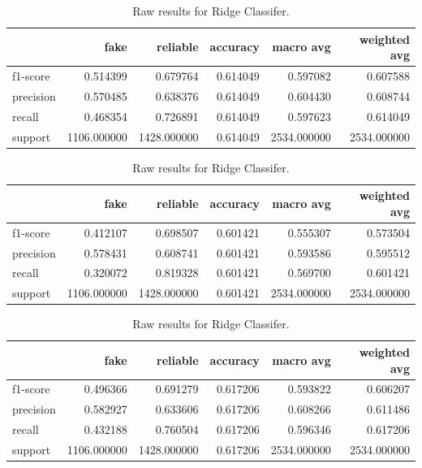 \begin{table}
\begin{subtable}{\textwidth}
\begin{tabular}{lrrrrr}
\toprule
{} &         fake &     reliable &  accuracy &    macro avg &  weighted avg \\
\midrule
f1-score  &     0.514399 &     0.679764 &  0.614049 &     0.597082 &      0.607588 \\
precision &     0.570485 &     0.638376 &  0.614049 &     0.604430 &      0.608744 \\
recall    &     0.468354 &     0.726891 &  0.614049 &     0.597623 &      0.614049 \\
support   &  1106.000000 &  1428.000000 &  0.614049 &  2534.000000 &   2534.000000 \\
\bottomrule
\end{tabular}
\caption{Raw results for Linear SVM}
\end{subtable}

\begin{subtable}{\textwidth}
\begin{tabular}{lrrrrr}
\toprule
{} &         fake &     reliable &  accuracy &    macro avg &  weighted avg \\
\midrule
f1-score  &     0.412107 &     0.698507 &  0.601421 &     0.555307 &      0.573504 \\
precision &     0.578431 &     0.608741 &  0.601421 &     0.593586 &      0.595512 \\
recall    &     0.320072 &     0.819328 &  0.601421 &     0.569700 &      0.601421 \\
support   &  1106.000000 &  1428.000000 &  0.601421 &  2534.000000 &   2534.000000 \\
\bottomrule
\end{tabular}
\caption{Raw results for Na\"{i}ve-Bayes}
\end{subtable}

\begin{subtable}{\textwidth}
\begin{tabular}{lrrrrr}
\toprule
{} &         fake &     reliable &  accuracy &    macro avg &  weighted avg \\
\midrule
f1-score  &     0.496366 &     0.691279 &  0.617206 &     0.593822 &      0.606207 \\
precision &     0.582927 &     0.633606 &  0.617206 &     0.608266 &      0.611486 \\
recall    &     0.432188 &     0.760504 &  0.617206 &     0.596346 &      0.617206 \\
support   &  1106.000000 &  1428.000000 &  0.617206 &  2534.000000 &   2534.000000 \\
\bottomrule
\end{tabular}
\caption{Raw results for Ridge Classifer.}
\end{subtable}


\end{table}
